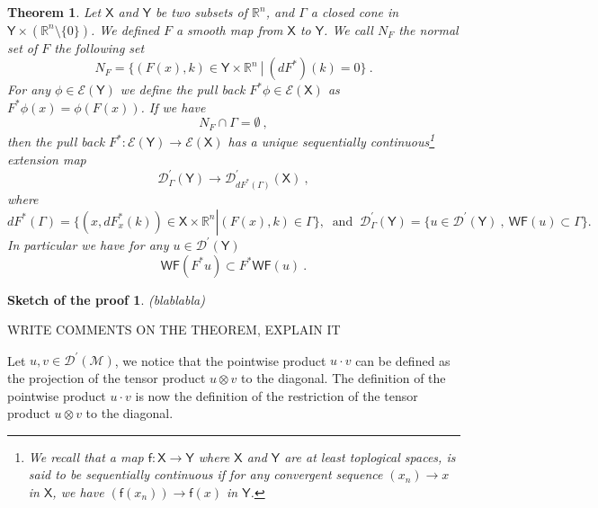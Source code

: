 \documentclass[11pt]{book}
\newcommand{\hilight}[1]{\colorbox{yellow!80!black}{#1}}
\newcommand{\WF}{\mathsf{WF}}
\newcommand{\Dcal}{\mathcal{D}}
\newcommand{\Ecal}{\mathcal{E}}
\newcommand{\Mcal}{\mathcal{M}}
\newcommand{\Rbb}{\mathbb{R}}
\newcommand{\Xsf}{\mathsf{X}}
\newcommand{\Ysf}{\mathsf{Y}}
\newcommand{\fsf}{\mathsf{f}}
\theoremstyle{break}
\newtheorem{theorem}{Theorem}[chapter]
\newtheorem{sketch}{Sketch of the proof}[chapter]
\begin{document}
\begin{theorem}\label{theo:pullback_wf}
Let $\Xsf$ and $\Ysf$ be two subsets of $\Rbb^n$, and $\Gamma$ a closed cone in $\Ysf \times\left(\Rbb^n\setminus\{0\}\right)$. 
%
We defined $F$ a smooth map from $\Xsf$ to $\Ysf$. We call $N_F$ the normal set of $F$ the following set
%
\begin{equation*}
N_F = \left. \bigg\{ (F(x),k) \in \Ysf \times \Rbb^n \ \right| \ (dF^\ast)(k) = 0 \bigg\} \ . 
\end{equation*}
%
For any $\phi \in \Ecal(\Ysf)$ we define the pull back $F^\ast\phi \in \Ecal(\Xsf)$ as $F^\ast\phi(x) =\phi(F(x))$. 
If we have
%
\begin{equation*}
N_F \cap \Gamma = \emptyset \ , 
\end{equation*}
%
then the pull back $F^\ast : \Ecal(\Ysf) \to \Ecal(\Xsf)$ has a unique sequentially continuous\footnote{We recall that a map $\fsf : \Xsf \to \Ysf$ where $\Xsf$ and $\Ysf$ are at least toplogical spaces, is said to be sequentially continuous if for any convergent sequence $(x_n) \to x$ in $\Xsf$, we have $(\fsf(x_n)) \to \fsf(x)$ in $\Ysf$.} extension map 
%
\begin{equation*}
\Dcal^\prime_\Gamma(\Ysf) \to \Dcal^\prime_{dF^\ast(\Gamma)}(\Xsf) \ , 
\end{equation*}
%
where 
%
\begin{equation*}
dF^\ast(\Gamma) = \left. \bigg\{ \left(x,dF^\ast_x(k)\right) \in \Xsf \times \Rbb^n \right| (F(x),k) \in \Gamma \bigg\} , \ \mbox{ and } \ \Dcal^\prime_\Gamma(\Ysf) = \bigg\{ u \in \Dcal^\prime(\Ysf) \ , \ \WF(u) \subset \Gamma \bigg\} .
\end{equation*}
%
In particular we have for any $u \in \Dcal^\prime(\Ysf)$
%
\begin{equation*}
\WF(F^\ast u) \subset F^\ast \WF(u) \ .
\end{equation*}
%
\end{theorem}


\begin{sketch}
\hilight{(blablabla)}
\end{sketch}


\bigskip
\noindent
\hilight{WRITE COMMENTS ON THE THEOREM, EXPLAIN IT}
\bigskip


Let $u,v \in \Dcal^\prime(\Mcal)$, we notice that the pointwise product $u \cdot v$ can be defined as the projection of the tensor product $u \otimes v$ to the diagonal. The definition of the pointwise product $u \cdot v$ is now the definition of the restriction of the tensor product $u \otimes v$ to the diagonal. 
\end{document}
